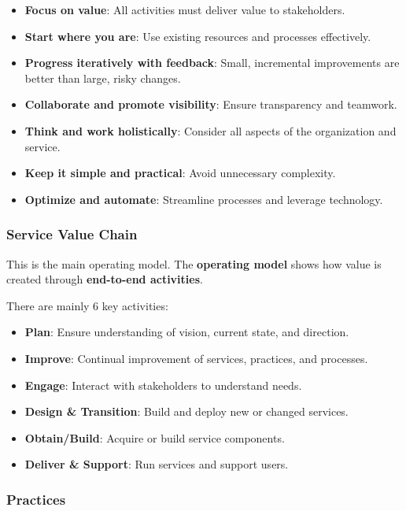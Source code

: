 \begin{itemize}
    \item \textbf{Focus on value}: All activities must deliver value to stakeholders.
    \item \textbf{Start where you are}: Use existing resources and processes effectively.
    \item \textbf{Progress iteratively with feedback}: Small, incremental improvements are better than large, risky changes.
    \item \textbf{Collaborate and promote visibility}: Ensure transparency and teamwork.
    \item \textbf{Think and work holistically}: Consider all aspects of the organization and service.
    \item \textbf{Keep it simple and practical}: Avoid unnecessary complexity.
    \item \textbf{Optimize and automate}: Streamline processes and leverage technology.
\end{itemize}

\subsubsection{Service Value Chain}

\indent 

This is the main operating model. The \textbf{operating model} shows how value is created through \textbf{end-to-end activities}.

There are mainly 6 key activities:

\begin{itemize}
    \item \textbf{Plan}: Ensure understanding of vision, current state, and direction.
    \item \textbf{Improve}: Continual improvement of services, practices, and processes.
    \item \textbf{Engage}: Interact with stakeholders to understand needs.
    \item \textbf{Design \& Transition}: Build and deploy new or changed services.
    \item \textbf{Obtain/Build}: Acquire or build service components.
    \item \textbf{Deliver \& Support}: Run services and support users.
\end{itemize}

\subsubsection{Practices}

